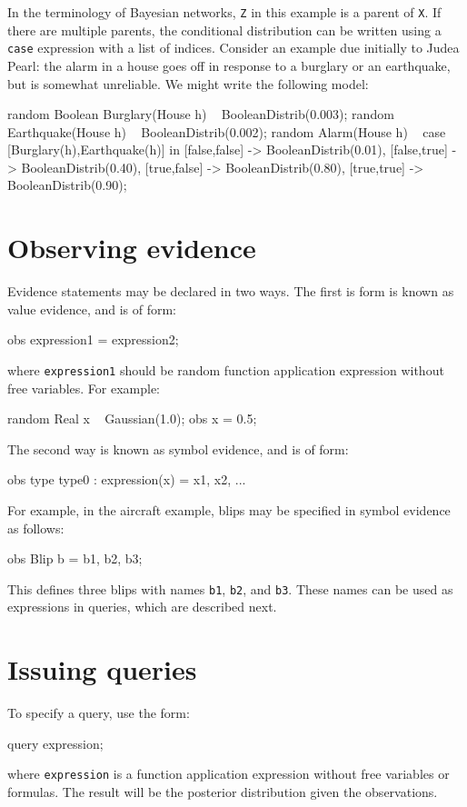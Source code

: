 \documentclass[12pt]{article}
\begin{document}
In the terminology of Bayesian networks, {\tt Z} in this example is a parent of {\tt X}.
If there are multiple parents, the conditional distribution can be written using
a {\tt case} expression with a list of indices. 
Consider an example due initially to Judea Pearl:
the alarm in a house goes off in response to a burglary or an earthquake,
but is somewhat unreliable. We might write the following model:
\begin{blogcode}
random Boolean Burglary(House h) ~ BooleanDistrib(0.003);
random Earthquake(House h) ~ BooleanDistrib(0.002);
random Alarm(House h) ~ case [Burglary(h),Earthquake(h)] in 
    {[false,false] -> BooleanDistrib(0.01),
     [false,true]  -> BooleanDistrib(0.40),
     [true,false]  -> BooleanDistrib(0.80),
     [true,true]   -> BooleanDistrib(0.90)};
\end{blogcode}





\section{Observing evidence}\label{evidence-section}
Evidence statements may be declared in two ways.  The first is form is known as value evidence, and is of form:
\begin{blogcode}
obs expression1 = expression2;
\end{blogcode}
where \texttt{expression1} should be random function application expression without free variables.  For example:
\begin{blogcode}
random Real x ~ Gaussian(1.0);
obs x = 0.5;
\end{blogcode}

The second way is known as symbol evidence, and is of form:
\begin{blogcode}
obs {type type0 : expression(x)} = { x1, x2, ...}
\end{blogcode}

For example, in the aircraft example, blips may be specified in symbol evidence as follows:
\begin{blogcode}
obs {Blip b} = {b1, b2, b3};
\end{blogcode}
This defines three blips with names \texttt{b1}, \texttt{b2}, and \texttt{b3}.  These names can be used as expressions in queries, which are described next.

\section{Issuing queries}\label{query-section}
To specify a query, use the form:
\begin{blogcode}
query expression;
\end{blogcode}
where \texttt{expression} is a function application expression without free variables or formulas. The result will be the posterior distribution given the observations. 
\end{document}
